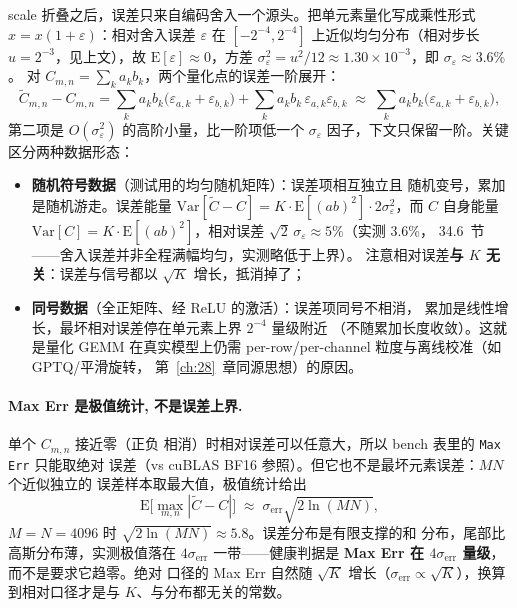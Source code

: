 scale 折叠之后，误差只来自编码舍入一个源头。把单元素量化写成乘性形式
$\hat{x} = x(1+\varepsilon)$：相对舍入误差 $\varepsilon$ 在
$[-2^{-4}, 2^{-4}]$ 上近似均匀分布（相对步长 $u = 2^{-3}$，见上文），故
$\mathrm{E}[\varepsilon] \approx 0$，方差 $\sigma_\varepsilon^2 = u^2/12
\approx 1.30\times 10^{-3}$，即 $\sigma_\varepsilon \approx 3.6\%$。
对 $C_{m,n}=\sum_k a_k b_k$，两个量化点的误差一阶展开：
\begin{equation}\label{eq:34-err-expand}
  \tilde{C}_{m,n} - C_{m,n}
  = \sum_{k} a_k b_k\bigl(\varepsilon_{a,k} + \varepsilon_{b,k}\bigr)
  + \sum_k a_k b_k\,\varepsilon_{a,k}\varepsilon_{b,k}
  \;\approx\; \sum_{k} a_k b_k\bigl(\varepsilon_{a,k} + \varepsilon_{b,k}\bigr),
\end{equation}
第二项是 $O(\sigma_\varepsilon^2)$ 的高阶小量，比一阶项低一个
$\sigma_\varepsilon$ 因子，下文只保留一阶。关键区分两种数据形态：
\begin{itemize}[itemsep=1pt,topsep=2pt]
  \item \textbf{随机符号数据}（测试用的均匀随机矩阵）：误差项相互独立且
        随机变号，累加是随机游走。误差能量
        $\mathrm{Var}[\tilde{C}-C] = K\cdot\mathrm{E}[(ab)^2]\cdot
        2\sigma_\varepsilon^2$，而 $C$ 自身能量
        $\mathrm{Var}[C] = K\cdot\mathrm{E}[(ab)^2]$，相对误差
        $\sqrt{2}\,\sigma_\varepsilon \approx 5\%$（实测 3.6\%，
        34.6~节——舍入误差并非全程满幅均匀，实测略低于上界）。
        注意相对误差\textbf{与 $K$ 无关}：误差与信号都以 $\sqrt{K}$
        增长，抵消掉了；
  \item \textbf{同号数据}（全正矩阵、经 ReLU 的激活）：误差项同号不相消，
        累加是线性增长，最坏相对误差停在单元素上界 $2^{-4}$ 量级附近
        （不随累加长度收敛）。这就是量化 GEMM 在真实模型上仍需
        per-row/per-channel 粒度与离线校准（如 GPTQ/平滑旋转，
        第~\ref{ch:28}~章同源思想）的原因。
\end{itemize}
\paragraph{Max Err 是极值统计, 不是误差上界.} 单个 $C_{m,n}$ 接近零（正负
相消）时相对误差可以任意大，所以 bench 表里的 \texttt{Max Err} 只能取绝对
误差（vs cuBLAS BF16 参照）。但它也不是最坏元素误差：$MN$ 个近似独立的
误差样本取最大值，极值统计给出
\begin{equation}\label{eq:34-err-max}
  \mathrm{E}\bigl[\max_{m,n} |\tilde{C}-C|\bigr]
  \;\approx\; \sigma_{\text{err}}\sqrt{2\ln(MN)},
\end{equation}
$M{=}N{=}4096$ 时 $\sqrt{2\ln(MN)} \approx 5.8$。误差分布是有限支撑的和
分布，尾部比高斯分布薄，实测极值落在 $4\sigma_{\text{err}}$ 一带——健康判据是
\textbf{Max Err 在 $4\sigma_{\text{err}}$ 量级}，而不是要求它趋零。绝对
口径的 Max Err 自然随 $\sqrt{K}$ 增长（$\sigma_{\text{err}} \propto
\sqrt{K}$），换算到相对口径才是与 $K$、与分布都无关的常数。

